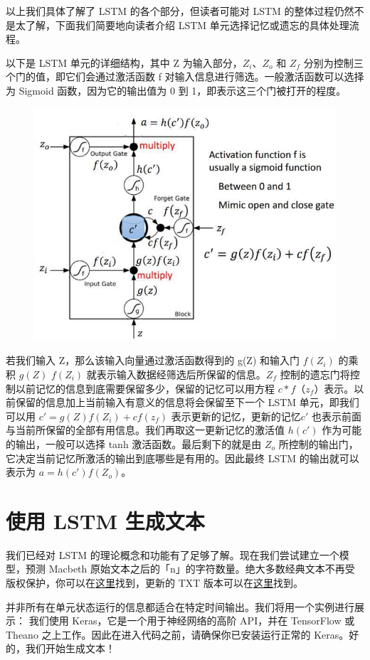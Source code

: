 \documentclass{article}
\begin{document}
以上我们具体了解了 LSTM 的各个部分，但读者可能对 LSTM 的整体过程仍然不是太了解，下面我们简要地向读者介绍 LSTM 单元选择记忆或遗忘的具体处理流程。

以下是 LSTM 单元的详细结构，其中 Z 为输入部分，$Z_i$、$Z_o$ 和 $Z_f$ 分别为控制三个门的值，即它们会通过激活函数 f 对输入信息进行筛选。一般激活函数可以选择为 Sigmoid 函数，因为它的输出值为 0 到 1，即表示这三个门被打开的程度。
\begin{figure}[H]
	\centering
	\includegraphics[scale=0.3]{6.jpg}
\end{figure}
若我们输入 Z，那么该输入向量通过激活函数得到的 g(Z) 和输入门 $f(Z_i)$ 的乘积 $g(Z)$ $f(Z_i )$ 就表示输入数据经筛选后所保留的信息。$Z_f$ 控制的遗忘门将控制以前记忆的信息到底需要保留多少，保留的记忆可以用方程 $c*f（z_f$）表示。以前保留的信息加上当前输入有意义的信息将会保留至下一个 LSTM 单元，即我们可以用 $c' = g(Z)f(Z_i) + cf(z_f)$ 表示更新的记忆，更新的记忆$ c'$ 也表示前面与当前所保留的全部有用信息。我们再取这一更新记忆的激活值 $h(c')$ 作为可能的输出，一般可以选择 tanh 激活函数。最后剩下的就是由 $Z_o$ 所控制的输出门，它决定当前记忆所激活的输出到底哪些是有用的。因此最终 LSTM 的输出就可以表示为 $a = h(c')f(Z_o)$。
\section{ 使用 LSTM 生成文本}

我们已经对 LSTM 的理论概念和功能有了足够了解。现在我们尝试建立一个模型，预测 Macbeth 原始文本之后的「n」的字符数量。绝大多数经典文本不再受版权保护，你可以在\href{https://www.gutenberg.org/}{这里}找到，更新的 TXT 版本可以在\href{https://s3-ap-south-1.amazonaws.com/av-blog-media/wp-content/uploads/2017/12/10165151/macbeth.txt}{这里}找到。

并非所有在单元状态运行的信息都适合在特定时间输出。我们将用一个实例进行展示：
我们使用 Keras，它是一个用于神经网络的高阶 API，并在 TensorFlow 或 Theano 之上工作。因此在进入代码之前，请确保你已安装运行正常的 Keras。好的，我们开始生成文本！
\end{document}
